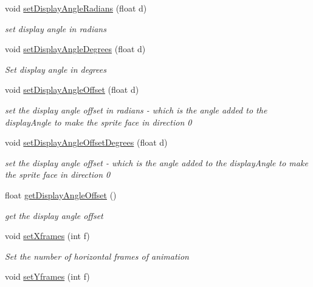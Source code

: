 \begin{DoxyCompactItemize}
void \mbox{\hyperlink{class_r_c___framework_1_1_sprite3_a3e00764164dccc3eb6104e5ec643033a}{set\+Display\+Angle\+Radians}} (float d)
\begin{DoxyCompactList}\small\item\em set display angle in radians \end{DoxyCompactList}\item 
void \mbox{\hyperlink{class_r_c___framework_1_1_sprite3_a13036025a68f4353c2b9014d8634e836}{set\+Display\+Angle\+Degrees}} (float d)
\begin{DoxyCompactList}\small\item\em Set display angle in degrees \end{DoxyCompactList}\item 
void \mbox{\hyperlink{class_r_c___framework_1_1_sprite3_a2ec8cfce2feb2f1e648131e03099b147}{set\+Display\+Angle\+Offset}} (float d)
\begin{DoxyCompactList}\small\item\em set the display angle offset in radians -\/ which is the angle added to the display\+Angle to make the sprite face in direction 0 \end{DoxyCompactList}\item 
void \mbox{\hyperlink{class_r_c___framework_1_1_sprite3_a6269a6c50ca875525156d347b216e491}{set\+Display\+Angle\+Offset\+Degrees}} (float d)
\begin{DoxyCompactList}\small\item\em set the display angle offset -\/ which is the angle added to the display\+Angle to make the sprite face in direction 0 \end{DoxyCompactList}\item 
float \mbox{\hyperlink{class_r_c___framework_1_1_sprite3_aad5d5ae96adc595d808baf24a283982e}{get\+Display\+Angle\+Offset}} ()
\begin{DoxyCompactList}\small\item\em get the display angle offset \end{DoxyCompactList}\item 
void \mbox{\hyperlink{class_r_c___framework_1_1_sprite3_aab8c41c05cad46205425cfdb86b60e56}{set\+Xframes}} (int f)
\begin{DoxyCompactList}\small\item\em Set the number of horizontal frames of animation \end{DoxyCompactList}\item 
void \mbox{\hyperlink{class_r_c___framework_1_1_sprite3_a248e1776ffd7be872288f73fb7caeadd}{set\+Yframes}} (int f)

\end{DoxyCompactItemize}
